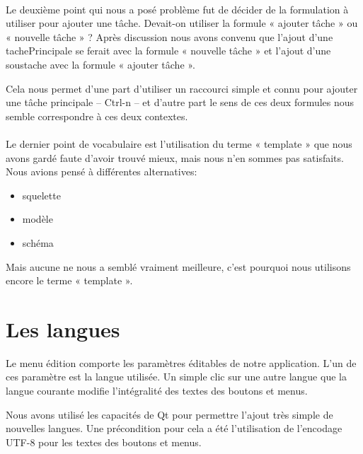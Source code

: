 \documentclass[11pt]{article}
\begin{document}
\paragraph*{}
Le deuxième point qui nous a posé problème fut de décider de la
formulation à utiliser pour ajouter une tâche. Devait-on utiliser la
formule « ajouter tâche » ou « nouvelle tâche » ? Après discussion
nous avons convenu que l'ajout d'une \gls{tachePrincipale} se ferait
avec la formule « nouvelle tâche » et l'ajout d'une \gls{soustache}
avec la formule « ajouter tâche ».

Cela nous permet d'une part d'utiliser un raccourci simple et connu
pour ajouter une tâche principale -- Ctrl-n -- et d'autre part le sens
de ces deux formules nous semble correspondre à ces deux contextes.

\paragraph*{}
Le dernier point de vocabulaire est l'utilisation du terme « template
» que nous avons gardé faute d'avoir trouvé mieux, mais nous n'en
sommes pas satisfaits. Nous avions pensé à différentes alternatives:
\begin{itemize}
\item squelette
\item modèle
\item schéma
\end{itemize}
Mais aucune ne nous a semblé vraiment meilleure, c'est pourquoi nous
utilisons encore le terme « template ».



\section{Les langues}

Le menu édition comporte les paramètres éditables de notre
application. L'un de ces paramètre est la langue utilisée. Un simple
clic sur une autre langue que la langue courante modifie l'intégralité
des textes des boutons et menus.

Nous avons utilisé les capacités de Qt pour permettre l'ajout très
simple de nouvelles langues. Une précondition pour cela a été
l'utilisation de l'encodage UTF-8 pour les textes des boutons et
menus.
\end{document}
